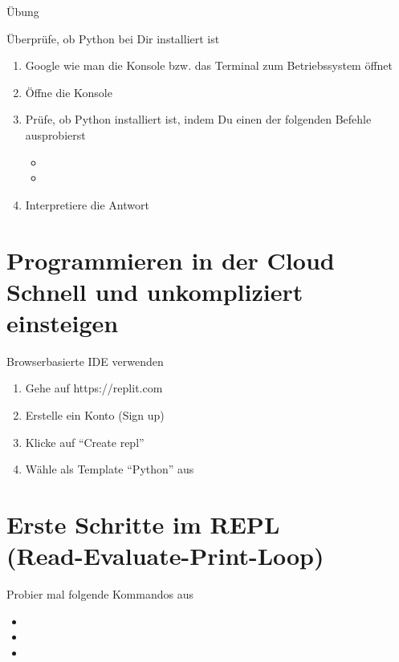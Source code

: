 \begin{frame}{Übung}
\begin{block}{Überprüfe, ob Python bei Dir installiert ist}
	\begin{enumerate}
		\item Google wie man die Konsole bzw. das Terminal zum Betriebssystem öffnet 
		\item Öffne die Konsole
		\item Prüfe, ob Python installiert ist, indem Du einen der folgenden Befehle ausprobierst 
		\begin{itemize}
			\item {}
			\item {}
		\end{itemize}
		\item Interpretiere die Antwort
	\end{enumerate}	
\end{block}
\end{frame}




\section{Programmieren in der Cloud \\ \footnotesize{Schnell und unkompliziert einsteigen}}

\begin{frame}
\begin{block}{Browserbasierte IDE verwenden}
	\vspace{2pt}
\begin{enumerate}
\item Gehe auf https://replit.com
\item Erstelle ein Konto (Sign up)
\item Klicke auf \enquote{Create repl}
\item Wähle als Template \enquote{Python} aus
\end{enumerate}
\end{block}
\end{frame}


\section{Erste Schritte im REPL \\ \footnotesize (Read-Evaluate-Print-Loop)}


\begin{frame}
\begin{block}{Probier mal folgende Kommandos aus}	
	\begin{itemize}
		\item {}
		\item {}
		\item {}
	\end{itemize}
\end{block}	
\end{frame}



